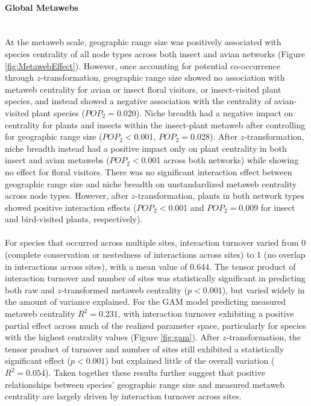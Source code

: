 \paragraph*{Global Metawebs}\mbox{}\\ 
At the metaweb scale, geographic range size was positively associated with species centrality of all node types across both insect and avian networks (Figure \ref{fig:MetawebEffect}). However, once accounting for potential co-occurrence through $z$-transformation, geographic range size showed no association with metaweb centrality for avian or insect floral visitors, or insect-visited plant species, and instead showed a negative association with the centrality of avian-visited plant species ($POP_2=$0.020). Niche breadth had a negative impact on centrality for plants and insects within the insect-plant metaweb after controlling for geographic range size ($POP_2<$0.001, $POP_2=$0.028). After $z$-transformation, niche breadth instead had a positive impact only on plant centrality in both insect and avian metawebs ($POP_2<$0.001 across both networks) while showing no effect for floral visitors. There was no significant interaction effect between geographic range size and niche breadth on unstandardized metaweb centrality across node types. However, after $z$-transformation, plants in both network types showed positive interaction effects ($POP_2<$0.001 and $POP_2=0.009$ for insect and bird-visited plants, respectively).



\paragraph{} For species that occurred across multiple sites, interaction turnover varied from 0 (complete conservation or nestedness of interactions across sites) to 1 (no overlap in interactions across sites), with a mean value of 0.644. The tensor product of interaction turnover and number of sites was statistically significant in predicting both raw and $z$-transformed metaweb centrality ($p<0.001$), but varied widely in the amount of variance explained. For the GAM model predicting measured metaweb centrality $R^2=0.231$, with interaction turnover exhibiting a positive partial effect across much of the realized parameter space, particularly for species with the highest centrality values (Figure \ref{fig:gam}). After $z$-transformation, the tensor product of turnover and number of sites still exhibited a statistically significant effect ($p<0.001$) but explained little of the overall variation ($R^2=0.054$). Taken together these results further suggest that positive relationships between species' geographic range size and measured metaweb centrality are largely driven by interaction turnover across sites. 




